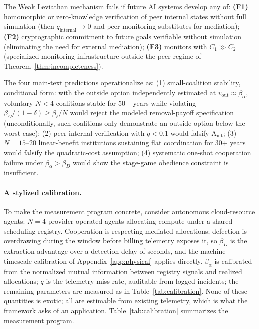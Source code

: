 \documentclass[manuscript,screen,review]{jair}
\begin{document}
The Weak Leviathan mechanism fails if future AI systems develop any of: \textbf{(F1)} homomorphic or zero-knowledge verification of peer internal states without full simulation (then $q_{\mathrm{internal}} \to 0$ and peer monitoring substitutes for mediation); \textbf{(F2)} cryptographic commitment to future goals verifiable without simulation (eliminating the need for external mediation); \textbf{(F3)} monitors with $C_1 \gg C_2$ (specialized monitoring infrastructure outside the peer regime of Theorem~\ref{thm:incompleteness}).

The four main-text predictions operationalize as: (1) small-coalition stability, conditional form: with the outside option independently estimated at $v_{\mathrm{out}} \approx \beta_\alpha$, voluntary $N<4$ coalitions stable for 50+ years while violating $\beta_\Omega/(1-\delta) \geq \beta_\ell/N$ would reject the modeled removal-payoff specification (unconditionally, such coalitions only demonstrate an outside option below the worst case); (2) peer internal verification with $q < 0.1$ would falsify A$_{\mathrm{int}}$; (3) $N = 15$--$20$ linear-benefit institutions sustaining flat coordination for 30+ years would falsify the quadratic-cost assumption; (4) systematic one-shot cooperation failure under $\beta_\alpha > \beta_D$ would show the stage-game obedience constraint is insufficient.

\paragraph{A stylized calibration.}
To make the measurement program concrete, consider autonomous cloud-resource agents: $N=4$ provider-operated agents allocating compute under a shared scheduling registry. Cooperation is respecting mediated allocations; defection is overdrawing during the window before billing telemetry exposes it, so $\beta_D$ is the extraction advantage over a detection delay of seconds, and the machine-timescale calibration of Appendix~\ref{app:physical} applies directly. $\beta_\alpha$ is calibrated from the normalized mutual information between registry signals and realized allocations; $q$ is the telemetry miss rate, auditable from logged incidents; the remaining parameters are measured as in Table~\ref{tab:calibration}. None of these quantities is exotic; all are estimable from existing telemetry, which is what the framework asks of an application. Table~\ref{tab:calibration} summarizes the measurement program.
\end{document}
